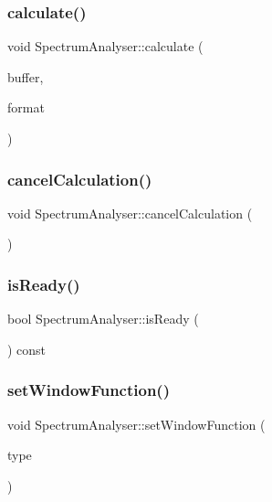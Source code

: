 \subsubsection{\texorpdfstring{calculate()}{calculate()}}
{\footnotesize\ttfamily void Spectrum\+Analyser\+::calculate (\begin{DoxyParamCaption}\item[{const Q\+Byte\+Array \&}]{buffer,  }\item[{const Q\+Audio\+Format \&}]{format }\end{DoxyParamCaption})}

\hypertarget{class_spectrum_analyser_a1ed17c67c3676facec7e987512eaa962}{}\label{class_spectrum_analyser_a1ed17c67c3676facec7e987512eaa962} 
\subsubsection{\texorpdfstring{cancel\+Calculation()}{cancelCalculation()}}
{\footnotesize\ttfamily void Spectrum\+Analyser\+::cancel\+Calculation (\begin{DoxyParamCaption}{ }\end{DoxyParamCaption})}

\hypertarget{class_spectrum_analyser_acac3bd1ac5fc255c01ea0288e50fee6c}{}\label{class_spectrum_analyser_acac3bd1ac5fc255c01ea0288e50fee6c} 
\subsubsection{\texorpdfstring{is\+Ready()}{isReady()}}
{\footnotesize\ttfamily bool Spectrum\+Analyser\+::is\+Ready (\begin{DoxyParamCaption}{ }\end{DoxyParamCaption}) const}

\hypertarget{class_spectrum_analyser_a6aeb6c39dd89dd5c5881198ae413ec74}{}\label{class_spectrum_analyser_a6aeb6c39dd89dd5c5881198ae413ec74} 
\subsubsection{\texorpdfstring{set\+Window\+Function()}{setWindowFunction()}}
{\footnotesize\ttfamily void Spectrum\+Analyser\+::set\+Window\+Function (\begin{DoxyParamCaption}\item[{\hyperlink{spectrum_8h_adae4545e1609513867a86cc5e91fc1d4}{Window\+Function}}]{type }\end{DoxyParamCaption})}

